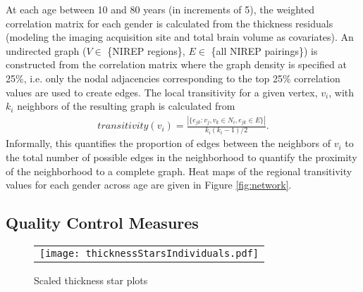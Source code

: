 At each age between 10 and 80 years (in increments of 5), the weighted correlation
matrix for each gender is calculated from the thickness residuals 
(modeling the imaging acquisition site and total brain volume as covariates).  An undirected graph ($V \in$ \{NIREP regions\}, $E \in$ \{all NIREP pairings\})
is constructed from the correlation matrix where the graph density is specified at 25\%, i.e. only the nodal adjacencies corresponding to the top 25\% correlation values are used to create edges.    The local transitivity for a given vertex, $v_i$, with $k_i$ neighbors of the resulting graph is calculated from
\begin{align}
  transitivity(v_i) = \frac{|\{e_{jk}: v_j, v_k \in N_i, e_{jk} \in E \}|}{k_i (k_i-1)/2}.
\end{align}
Informally, this quantifies the proportion of edges between the neighbors of $v_i$ to the total number of possible edges in the neighborhood to quantify the proximity of the neighborhood to a complete graph.  Heat maps of the regional transitivity values for each
gender across age are given in Figure \ref{fig:network}.  


\subsection{Quality Control Measures}
\begin{figure}
  \centering
  \begin{tabular}{c}
  \texttt{[image: thicknessStarsIndividuals.pdf]} 
  \end{tabular}
  \caption{Scaled thickness star plots
  }
  \label{fig:stars}
\end{figure}






